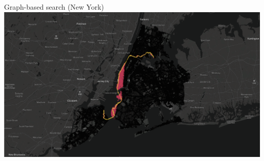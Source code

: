 \documentclass[aspectratio=169]{beamer}
\makeatletter
\renewcommand{\white}[1]{{\color{pureminimalistic@text@white} #1}}
\makeatother
\begin{document}
\begin{frame}[plain]{Graph-based search \white{(New York)}}
    \includegraphics[width=1.0\linewidth, keepaspectratio, trim={0.5cm 1.5cm 0 2.5cm}, clip]{figures/ny_graph_based_geodesic.png}
\end{frame}
\end{document}
